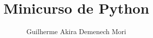 \documentclass[aspectratio=169,12pt]{beamer}
\title{Minicurso de Python}
\author{Guilherme Akira Demenech Mori}
\date{}
\institute{
}
\newcommand{\modo}[2]{
} %
\begin{document}
	\modo{}{\color{white}}
\end{document}
